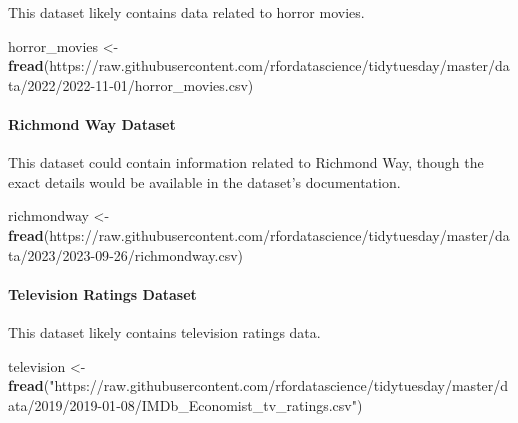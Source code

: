 \documentclass[
  b5paper]{book}
\newenvironment{Shaded}{\begin{snugshade}}{\end{snugshade}}
\newcommand{\FunctionTok}[1]{\textcolor[rgb]{0.13,0.29,0.53}{\textbf{#1}}}
\newcommand{\NormalTok}[1]{#1}
\newcommand{\OtherTok}[1]{\textcolor[rgb]{0.56,0.35,0.01}{#1}}
\newcommand{\StringTok}[1]{\textcolor[rgb]{0.31,0.60,0.02}{#1}}
\begin{document}
This dataset likely contains data related to horror movies.

\begin{Shaded}
\begin{Highlighting}[]
\NormalTok{horror\_movies }\OtherTok{\textless{}{-}} \FunctionTok{fread}\NormalTok{(}\StringTok{\textquotesingle{}https://raw.githubusercontent.com/rfordatascience/tidytuesday/master/data/2022/2022{-}11{-}01/horror\_movies.csv\textquotesingle{}}\NormalTok{)}
\end{Highlighting}
\end{Shaded}

\hypertarget{richmond-way-dataset}{%
\paragraph*{Richmond Way Dataset}\label{richmond-way-dataset}}

This dataset could contain information related to Richmond Way, though the exact details would be available in the dataset's documentation.

\begin{Shaded}
\begin{Highlighting}[]
\NormalTok{richmondway }\OtherTok{\textless{}{-}} \FunctionTok{fread}\NormalTok{(}\StringTok{\textquotesingle{}https://raw.githubusercontent.com/rfordatascience/tidytuesday/master/data/2023/2023{-}09{-}26/richmondway.csv\textquotesingle{}}\NormalTok{)}
\end{Highlighting}
\end{Shaded}

\hypertarget{television-ratings-dataset}{%
\paragraph*{Television Ratings Dataset}\label{television-ratings-dataset}}

This dataset likely contains television ratings data.

\begin{Shaded}
\begin{Highlighting}[]
\NormalTok{television }\OtherTok{\textless{}{-}} \FunctionTok{fread}\NormalTok{(}\StringTok{"https://raw.githubusercontent.com/rfordatascience/tidytuesday/master/data/2019/2019{-}01{-}08/IMDb\_Economist\_tv\_ratings.csv"}\NormalTok{)}
\end{Highlighting}
\end{Shaded}
\end{document}
